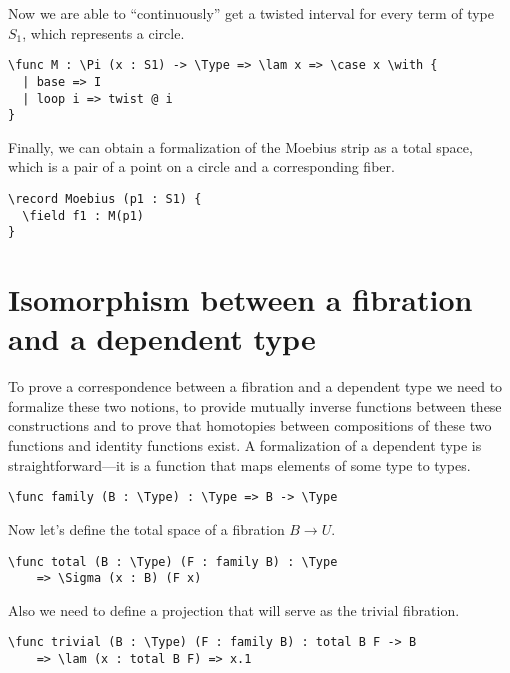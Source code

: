 Now we are able to ``continuously'' get a twisted interval for every term of type $S_1$, which represents a circle.

\begin{ListingEnv}[H]
\begin{lstlisting}
\func M : \Pi (x : S1) -> \Type => \lam x => \case x \with {
  | base => I
  | loop i => twist @ i
}
\end{lstlisting}
\end{ListingEnv}

Finally, we can obtain a formalization of the Moebius strip as a total space, which is a pair of a point on a circle and a corresponding fiber.

\begin{ListingEnv}[H]
\begin{lstlisting}
\record Moebius (p1 : S1) {
  \field f1 : M(p1)
}
\end{lstlisting}
\end{ListingEnv}

\section{Isomorphism between a fibration and a dependent type}

To prove a correspondence between a fibration and a dependent type we need to formalize these two notions, to provide mutually inverse functions between these constructions and to prove that homotopies between compositions of these two functions and identity functions exist. 
A formalization of a dependent type is straightforward---it is a function that maps elements of some type to types.
\begin{ListingEnv}[H]
\begin{lstlisting}
\func family (B : \Type) : \Type => B -> \Type
\end{lstlisting}
\end{ListingEnv}
Now let's define the total space of a fibration $B \to U$.
\begin{ListingEnv}[H]
\begin{lstlisting}
\func total (B : \Type) (F : family B) : \Type 
	=> \Sigma (x : B) (F x)
\end{lstlisting}
\end{ListingEnv}
Also we need to define a projection that will serve as the trivial fibration.
\begin{ListingEnv}[H]
\begin{lstlisting}
\func trivial (B : \Type) (F : family B) : total B F -> B 
	=> \lam (x : total B F) => x.1
\end{lstlisting}
\end{ListingEnv}

